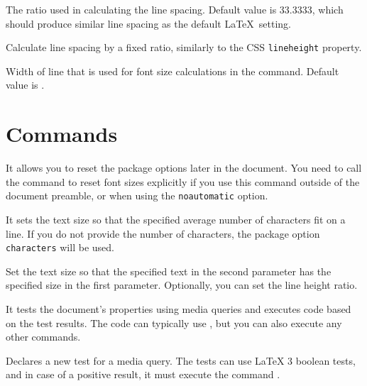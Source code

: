 \documentclass{ltxdoc}
\newcommand\StartDescribe[1]{%
  \par\medskip\noindent\DescribeMacro#1
}
\begin{document}
\noindent {} The ratio used in calculating the line spacing. Default value is 33.3333, which should produce similar line spacing as the default \LaTeX\ setting.

\noindent {} Calculate line spacing by a fixed ratio, similarly to the CSS \texttt{lineheight} property.

\noindent {} Width of line that is used for font size calculations in the \cmd{\setsizes} command. Default value is \cmd{\textwidth}.




\section{Commands}

\StartDescribe\ResponsiveSetup
\cmd\ResponsiveSetup{}

\noindent It allows you to reset the package options later in the document. You
need to call the \cmd{\setsizes} command to reset font sizes explicitly if you use this command
outside of the document preamble, or when using the \texttt{noautomatic} option.

\StartDescribe\setsizes
\cmd\setsizes{}

\noindent It sets the text size so that the specified average number of
characters fit on a line. If you do not provide the number of characters, the
package option \texttt{characters} will be used.


\StartDescribe\fonttobox
\cmd\fonttobox{}

\noindent Set the text size so that the specified text in the second parameter has
the specified size in the first parameter. Optionally, you can set the line
height ratio.

\StartDescribe\mediaquery
\cmd\mediaquery{}

\noindent
It tests the document's properties using media queries and executes code based on the test results.
The code can typically use \cmd\ResponsiveSetup, but you can also execute any other commands.

\StartDescribe\DeclareMediaQueryMatcher
\cmd\DeclareMediaQueryMatcher{}

\noindent Declares a new test for a media query. The tests can use LaTeX 3 boolean tests,
and in case of a positive result, it must execute the command 
\cmd\mediaquerytrue.
\end{document}
